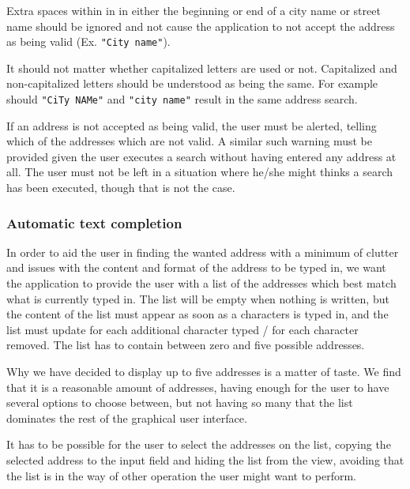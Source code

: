 \documentclass[a4paper,11pt]{article}
\begin{document}
Extra spaces within in in either the beginning or end of a city name or street name should be ignored and not cause the application to not accept the address as being valid (Ex. \texttt{"City    name"}).

It should not matter whether capitalized letters are used or not. Capitalized and non-capitalized letters should be understood as being the same. For example should \texttt{"CiTy NAMe"} and \texttt{"city name"} result in the same address search.

If an address is not accepted as being valid, the user must be alerted, telling which of the addresses which are not valid. A similar such warning must be provided given the user executes a search without having entered any address at all. The user must not be left in a situation where he/she might thinks a search has been executed, though that is not the case.

\subsubsection{Automatic text completion}
In order to aid the user in finding the wanted address with a minimum of clutter and issues with the content and format of the address to be typed in, we want the application to provide the user with a list of the addresses which best match what is currently typed in. The list will be empty when nothing is written, but the content of the list must appear as soon as a characters is typed in, and the list must update for each additional character typed / for each character removed. The list has to contain between zero and five possible addresses.

Why we have decided to display up to five addresses is a matter of taste. We find that it is a reasonable amount of addresses, having enough for the user to have several options to choose between, but not having so many that the list dominates the rest of the graphical user interface.

It has to be possible for the user to select the addresses on the list, copying the selected address to the input field and hiding the list from the view, avoiding that the list is in the way of other operation the user might want to perform.
\end{document}

